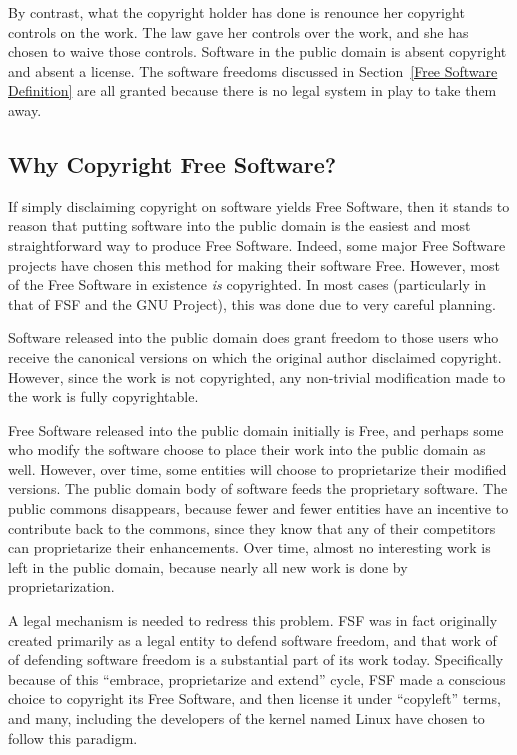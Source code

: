 \documentclass[12pt]{report}
\begin{document}
By contrast, what the copyright holder has done is renounce her copyright
controls on the work.  The law gave her controls over the work, and she
has chosen to waive those controls.  Software in the public domain is
absent copyright and absent a license.  The software freedoms discussed in
Section~\ref{Free Software Definition} are all granted because there is no
legal system in play to take them away.

\subsection{Why Copyright Free Software?}

If simply disclaiming copyright on software yields Free Software, then it
stands to reason that putting software into the public domain is the
easiest and most straightforward way to produce Free Software.  Indeed,
some major Free Software projects have chosen this method for making their
software Free.  However, most of the Free Software in existence \emph{is}
copyrighted.  In most cases (particularly in that of FSF and the GNU
Project), this was done due to very careful planning.

Software released into the public domain does grant freedom to those users
who receive the canonical versions on which the original author disclaimed
copyright.  However, since the work is not copyrighted, any non-trivial
modification made to the work is fully copyrightable.

Free Software released into the public domain initially is Free, and
perhaps some who modify the software choose to place their work into the
public domain as well.  However, over time, some entities will choose to
proprietarize their modified versions.  The public domain body of software
feeds the proprietary software.  The public commons disappears, because
fewer and fewer entities have an incentive to contribute back to the
commons, since they know that any of their competitors can proprietarize
their enhancements.  Over time, almost no interesting work is left in the
public domain, because nearly all new work is done by proprietarization.

A legal mechanism is needed to redress this problem.  FSF was in fact
originally created primarily as a legal entity to defend software freedom,
and that work of of defending software freedom is a substantial part of
its work today.  Specifically because of this ``embrace, proprietarize and
extend'' cycle, FSF made a conscious choice to copyright its Free Software,
and then license it under ``copyleft'' terms, and many, including the
developers of the kernel named Linux have chosen to follow this paradigm.
\end{document}
